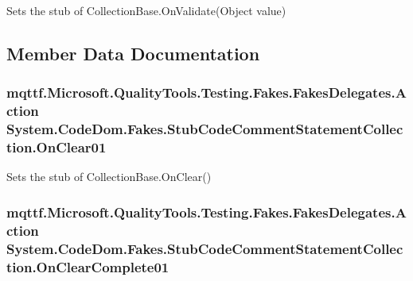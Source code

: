 Sets the stub of Collection\-Base.\-On\-Validate(\-Object value)



\subsection{Member Data Documentation}
\hypertarget{class_system_1_1_code_dom_1_1_fakes_1_1_stub_code_comment_statement_collection_a5d737751aff740b92e14d994c9badb39}{
\subsubsection[{On\-Clear01}]{\setlength{\rightskip}{0pt plus 5cm}mqttf.\-Microsoft.\-Quality\-Tools.\-Testing.\-Fakes.\-Fakes\-Delegates.\-Action System.\-Code\-Dom.\-Fakes.\-Stub\-Code\-Comment\-Statement\-Collection.\-On\-Clear01}}\label{class_system_1_1_code_dom_1_1_fakes_1_1_stub_code_comment_statement_collection_a5d737751aff740b92e14d994c9badb39}


Sets the stub of Collection\-Base.\-On\-Clear()

\hypertarget{class_system_1_1_code_dom_1_1_fakes_1_1_stub_code_comment_statement_collection_af3344ba12b78037a33ca8cfbd04ebf3a}{
\subsubsection[{On\-Clear\-Complete01}]{\setlength{\rightskip}{0pt plus 5cm}mqttf.\-Microsoft.\-Quality\-Tools.\-Testing.\-Fakes.\-Fakes\-Delegates.\-Action System.\-Code\-Dom.\-Fakes.\-Stub\-Code\-Comment\-Statement\-Collection.\-On\-Clear\-Complete01}}\label{class_system_1_1_code_dom_1_1_fakes_1_1_stub_code_comment_statement_collection_af3344ba12b78037a33ca8cfbd04ebf3a}


